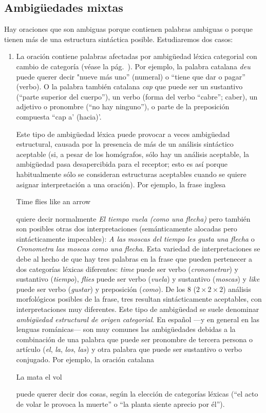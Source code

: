 \subsection{Ambigüedades mixtas} Hay oraciones que son ambiguas porque contienen palabras ambiguas o porque tienen más de una estructura sintáctica posible. Estudiaremos dos casos: \begin{enumerate} \item La oración contiene palabras afectadas por ambigüedad léxica categorial con cambio de categoría (véase la pág.~\pageref{pg:catlex}). Por ejemplo, la palabra catalana \emph{deu} puede querer decir "nueve más uno'' (numeral) o ``tiene que dar o pagar'' (verbo). O la palabra también catalana \emph{cap} que puede ser un sustantivo (``parte superior del cuerpo''), un verbo (forma del verbo ``cabre''; caber), un adjetivo o pronombre (``no hay ninguno''), o parte de la preposición compuesta ``cap a' (hacia)'. 

Este tipo de ambigüedad léxica puede provocar a veces ambigüedad estructural, causada por la presencia de más de un análisis sintáctico aceptable (si, a pesar de los homógrafos, sólo hay un análisis aceptable, la ambigüedad pasa desapercibida para el receptor; esto es así porque habitualmente sólo se consideran estructuras aceptables cuando se quiere asignar interpretación a una oración). Por ejemplo, la frase inglesa \begin{exemple} Time flies like an arrow \end{exemple} quiere decir normalmente \emph{El tiempo vuela (como una flecha)} pero también son posibles otras dos interpretaciones (semánticamente alocadas pero sintácticamente impecables): \emph{A las moscas del tiempo les gusta una flecha} o \emph{Cronometra las moscas como una flecha}. Esta variedad de interpretaciones se debe al hecho de que hay tres palabras en la frase que pueden pertenecer a dos categorías léxicas diferentes: \emph{time} puede ser verbo (\emph{cronometrar}) y sustantivo (\emph{tiempo}), \emph{flies} puede ser verbo (\emph{vuela}) y sustantivo (\emph{moscas}) y \emph{like} puede ser verbo (\emph{gustar}) y preposición (\emph{como}). De los 8 ($2\times 2\times 2$) análisis morfológicos posibles de la frase, tres resultan sintácticamente aceptables, con interpretaciones muy diferentes. Este tipo de ambigüedad se suele denominar \emph{ambigüedad estructural de origen categorial}. En español ---y en general en las lenguas románicas--- son muy comunes las ambigüedades debidas a la combinación de una palabra que puede ser pronombre de tercera persona o artículo (\emph{el}, \emph{la}, \emph{} \emph{los}, \emph{las}) y otra palabra que puede ser sustantivo o verbo conjugado. Por ejemplo, la oración catalana \begin{exemple} La mata el vol \end{exemple} puede querer decir dos cosas, según la elección de categorías léxicas (``el acto de volar le provoca la muerte'' o ``la planta siente aprecio por él''). 


\end{enumerate}
